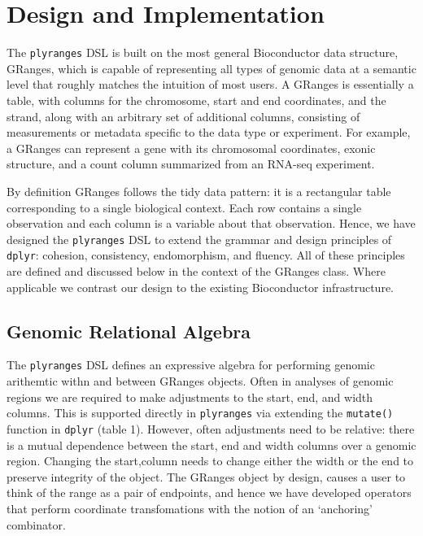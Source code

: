 \documentclass[10pt,letterpaper]{article}
\begin{document}
\section{Design and Implementation}\label{design-and-implementation}

The \texttt{plyranges} DSL is built on the most general Bioconductor
data structure, GRanges, which is capable of representing all types of
genomic data at a semantic level that roughly matches the intuition of
most users. A GRanges is essentially a table, with columns for the
chromosome, start and end coordinates, and the strand, along with an
arbitrary set of additional columns, consisting of measurements or
metadata specific to the data type or experiment. For example, a GRanges
can represent a gene with its chromosomal coordinates, exonic structure,
and a count column summarized from an RNA-seq experiment.

By definition GRanges follows the tidy data pattern: it is a rectangular
table corresponding to a single biological context. Each row contains a
single observation and each column is a variable about that observation.
Hence, we have designed the \texttt{plyranges} DSL to extend the grammar
and design principles of \texttt{dplyr}: cohesion, consistency,
endomorphism, and fluency. All of these principles are defined and
discussed below in the context of the GRanges class. Where applicable we
contrast our design to the existing Bioconductor infrastructure.

\subsection{Genomic Relational
Algebra}\label{genomic-relational-algebra}

The \texttt{plyranges} DSL defines an expressive algebra for performing
genomic arithemtic withn and between GRanges objects. Often in analyses
of genomic regions we are required to make adjustments to the start,
end, and width columns. This is supported directly in \texttt{plyranges}
via extending the \texttt{mutate()} function in \texttt{dplyr} (table
1). However, often adjustments need to be relative: there is a mutual
dependence between the start, end and width columns over a genomic
region. Changing the start,column needs to change either the width or
the end to preserve integrity of the object. The GRanges object by
design, causes a user to think of the range as a pair of endpoints, and
hence we have developed operators that perform coordinate transfomations
with the notion of an `anchoring' combinator.
\end{document}
